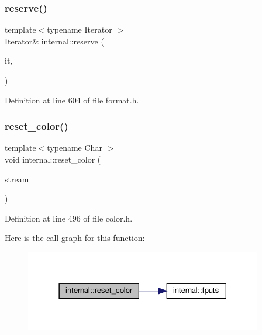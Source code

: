 \subsubsection{\texorpdfstring{reserve()}{reserve()}\hspace{0.1cm}{\footnotesize\ttfamily [2/2]}}
{\footnotesize\ttfamily template$<$typename Iterator $>$ \\
Iterator\& internal\+::reserve (\begin{DoxyParamCaption}\item[{Iterator \&}]{it,  }\item[{std\+::size\+\_\+t}]{ }\end{DoxyParamCaption})\hspace{0.3cm}{\ttfamily [inline]}}



Definition at line 604 of file format.\+h.

\mbox{\label{namespaceinternal_aef3df5de8950cb056b5f412ba9e8033f}} 
\subsubsection{\texorpdfstring{reset\+\_\+color()}{reset\_color()}}
{\footnotesize\ttfamily template$<$typename Char $>$ \\
void internal\+::reset\+\_\+color (\begin{DoxyParamCaption}\item[{F\+I\+LE $\ast$}]{stream }\end{DoxyParamCaption})\hspace{0.3cm}{\ttfamily [inline]}}



Definition at line 496 of file color.\+h.

Here is the call graph for this function\+:
\nopagebreak
\begin{figure}[H]
\begin{center}
\leavevmode
\includegraphics[width=294pt]{namespaceinternal_aef3df5de8950cb056b5f412ba9e8033f_cgraph}
\end{center}
\end{figure}
\mbox{\label{namespaceinternal_a90b9a62d1536ba128a175690641f32d4}} 
